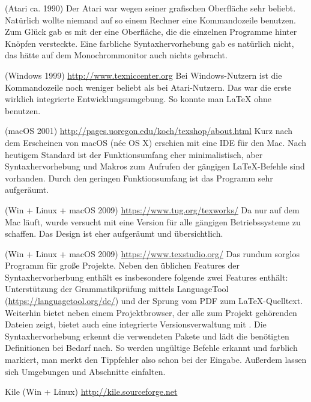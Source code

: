 \begin{labeling}{}
\item[\Program{TeXShell}] (Atari ca. 1990) Der Atari war wegen seiner
  grafischen Oberfläche sehr beliebt.  Natürlich wollte niemand auf so
  einem Rechner eine Kommandozeile benutzen.  Zum Glück gab es mit der
   eine Oberfläche, die die einzelnen Programme hinter
  Knöpfen versteckte.  Eine farbliche Syntaxhervorhebung gab es natürlich
  nicht, das hätte auf dem Monochrommonitor auch nichts gebracht.

\item[\Program{TexnicCenter}] (Windows 1999)
  \url{http://www.texniccenter.org}  Bei Windows-Nutzern ist die
  Kommandozeile noch weniger beliebt als bei Atari-Nutzern.  Das
   war die erste wirklich integrierte
  Entwicklungsumgebung.  So konnte man \LaTeX{} ohne 
  benutzen.

\item[\Program{Texshop}] (macOS 2001)
  \url{http://pages.uoregon.edu/koch/texshop/about.html}  Kurz nach dem
  Erscheinen von macOS (née OS X) erschien mit  eine IDE
  für den Mac.  Nach heutigem Standard ist der Funktionsumfang eher
  minimalistisch, aber Syntaxhervorhebung und Makros zum Aufrufen der
  gängigen \LaTeX{}-Befehle sind vorhanden.  Durch den geringen
  Funktionsumfang ist das Programm sehr aufgeräumt.

\item[\Program{TeXworks}] (Win + Linux + macOS 2009)
  \url{https://www.tug.org/texworks/}  Da  nur auf dem Mac
  läuft, wurde versucht mit  eine Version für alle
  gängigen Betriebssysteme zu schaffen.  Das Design ist eher aufgeräumt und
  übersichtlich.

\item[\Program{TeXStudio}] (Win + Linux + macOS 2009)
  \url{https://www.texstudio.org/}  Das rundum sorglos Programm für
  große Projekte.
  Neben den üblichen Features der Syntaxhervorherbung enthält es insbesondere folgende zwei Features enthält:
  Unterstützung der Grammatikprüfung mittels LanguageTool (\url{https://languagetool.org/de/}) und der Sprung vom PDF zum \LaTeX{}-Quelltext.
  Weiterhin bietet  neben einem Projektbrowser, der alle zum Projekt
  gehörenden Dateien zeigt, bietet auch eine integrierte
  Versionsverwaltung mit .  Die Syntaxhervorhebung erkennt die
  verwendeten Pakete und lädt die benötigten Definitionen bei Bedarf nach.
  So werden ungültige Befehle erkannt und farblich markiert, man merkt den
  Tippfehler also schon bei der Eingabe. Außerdem lassen sich Umgebungen
  und Abschnitte einfalten.

\item[Kile] (Win + Linux) \url{http://kile.sourceforge.net}

\end{labeling}


